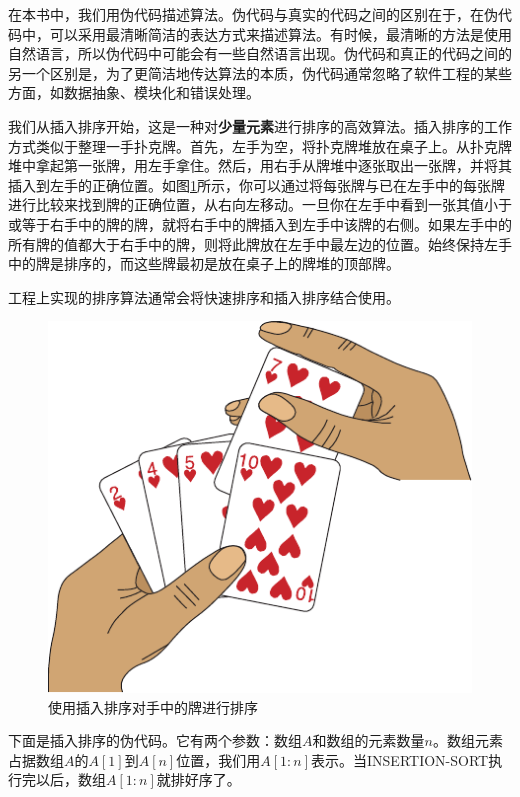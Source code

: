 \documentclass[lang=cn,newtx,10pt,scheme=chinese]{elegantbook}
\begin{document}
在本书中，我们用伪代码描述算法。伪代码与真实的代码之间的区别在于，在伪代码中，可以采用最清晰简洁的表达方式来描述算法。有时候，最清晰的方法是使用自然语言，所以伪代码中可能会有一些自然语言出现。伪代码和真正的代码之间的另一个区别是，为了更简洁地传达算法的本质，伪代码通常忽略了软件工程的某些方面，如数据抽象、模块化和错误处理。

我们从插入排序开始，这是一种对\textbf{少量元素}进行排序的高效算法。插入排序的工作方式类似于整理一手扑克牌。首先，左手为空，将扑克牌堆放在桌子上。从扑克牌堆中拿起第一张牌，用左手拿住。然后，用右手从牌堆中逐张取出一张牌，并将其插入到左手的正确位置。如图\ref{fig:使用插入排序对手中的牌进行排序}所示，你可以通过将每张牌与已在左手中的每张牌进行比较来找到牌的正确位置，从右向左移动。一旦你在左手中看到一张其值小于或等于右手中的牌的牌，就将右手中的牌插入到左手中该牌的右侧。如果左手中的所有牌的值都大于右手中的牌，则将此牌放在左手中最左边的位置。始终保持左手中的牌是排序的，而这些牌最初是放在桌子上的牌堆的顶部牌。

\begin{marker}
    工程上实现的排序算法通常会将快速排序和插入排序结合使用。
\end{marker}

\begin{figure}[htbp]
    \centering
    \includegraphics{算法导论第四版插图/第二章/插入排序打牌示意图.pdf}
    \caption{使用插入排序对手中的牌进行排序}
    \label{fig:使用插入排序对手中的牌进行排序}
\end{figure}

下面是插入排序的伪代码。它有两个参数：数组$A$和数组的元素数量$n$。数组元素占据数组$A$的$A[1]$到$A[n]$位置，我们用$A[1:n]$表示。当INSERTION-SORT执行完以后，数组$A[1:n]$就排好序了。
\end{document}
